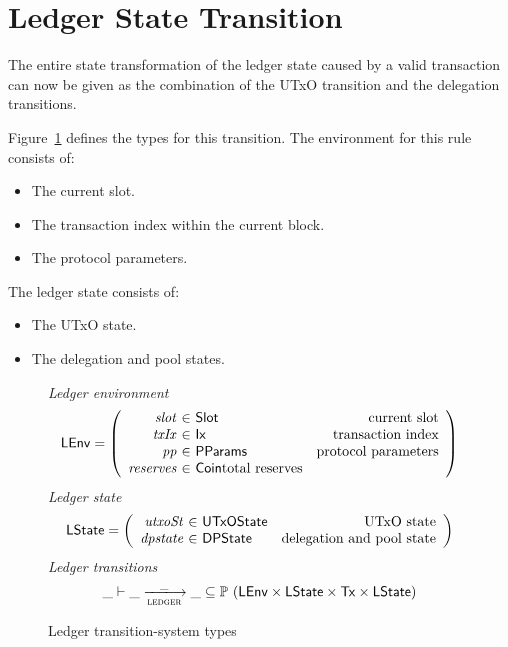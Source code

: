 \section{Ledger State Transition}
\label{sec:ledger-trans}

The entire state transformation of the ledger state caused by a valid transaction
can now be given as the combination of the UTxO transition and the delegation transitions.

Figure~\ref{fig:ts-types:ledger} defines the types for this transition.
The environment for this rule consists of:
\begin{itemize}
  \item The current slot.
  \item The transaction index within the current block.
  \item The protocol parameters.
\end{itemize}
The ledger state consists of:
\begin{itemize}
  \item The UTxO state.
  \item The delegation and pool states.
\end{itemize}

\begin{figure}[htb]
  \emph{Ledger environment}
  \begin{equation*}
    \LEnv =
    \left(
      \begin{array}{r@{~\in~}lr}
        \var{slot} & \Slot & \text{current slot}\\
        \var{txIx} & \Ix & \text{transaction index}\\
        \var{pp} & \PParams & \text{protocol parameters}\\
        \var{reserves} & \Coin \text{total reserves}
      \end{array}
    \right)
  \end{equation*}
  \emph{Ledger state}
  \begin{equation*}
    \LState =
    \left(
      \begin{array}{r@{~\in~}lr}
        \var{utxoSt} & \UTxOState & \text{UTxO state}\\
        \var{dpstate} & \DPState & \text{delegation and pool state}\\
      \end{array}
    \right)
  \end{equation*}
  \emph{Ledger transitions}
  \begin{equation*}
    \_ \vdash
    \var{\_} \trans{ledger}{\_} \var{\_}
    \subseteq \powerset (\LEnv \times \LState \times \Tx \times \LState)
  \end{equation*}
  \caption{Ledger transition-system types}
  \label{fig:ts-types:ledger}
\end{figure}

